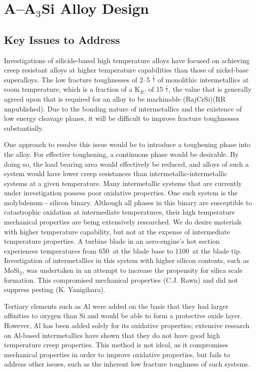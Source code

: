 \section{A--A$_3$Si Alloy Design}
\subsection{Key Issues to Address}
Investigations of silicide-based high temperature alloys have focused on achieving creep resistant alloys at higher temperature capabilities than those of nickel-base superalloys. The low fracture toughnesses of 2--5 \mega\pascal\usk\meter$^{\frac{1}{2}}$ of monolithic intermetallics at room temperature, which is a fraction of a K$_{IC}$ of 15 \mega\pascal\usk\meter$^{\frac{1}{2}}$, the value that is generally agreed upon that is required for an alloy to be machinable (RajCrSi)(RR unpublished).  Due to the bonding nature of intermetallics and the existence of low energy cleavage planes, it will be difficult to improve fracture toughnesses substantially.

One approach to resolve this issue would be to introduce a toughening phase into the alloy.  For effective toughening, a continuous phase would be desirable.  By doing so, the load bearing area would effectively be reduced, and alloys of such a system would have lower creep resistances than intermetallic-intermetallic systems at a given temperature. Many intermetallic systems that are currently under investigation possess poor oxidative properties.  One such system is the molybdenum - silicon binary.  Although all phases in this binary are susceptible to catastrophic oxidation at intermediate temperatures, their high temperature mechanical properties are being extensively researched.  We do desire materials with higher temperature capability, but not at the expense of intermediate temperature properties.  A turbine blade in an aero-engine's hot section experiences temperatures from 650\celsius\ at the blade base to 1100\celsius\ at the blade tip.  Investigation of intermetallics in this system with higher silicon contents, such as MoSi$_2$, was undertaken in an attempt to increase the propensity for silica scale formation.  This compromised mechanical properties (C.J. Rawn) and did not suppress pesting (K. Yanigihara). 

Tertiary elements such as Al were added on the basis that they had larger affinities to oxygen than Si and would be able to form a protective oxide layer.  However, Al has been added solely for its oxidative properties; extensive research on Al-based intermetallics have shown that they do not have good high temperature creep properties. This method is not ideal, as it compromises mechanical properties in order to improve oxidative properties, but fails to address other issues, such as the inherent low fracture toughness of such systems. 

